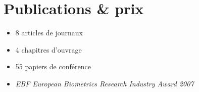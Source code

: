 \documentclass{simplecv}
\begin{document}
\section{Publications \& prix}

\begin{itemize}
  \item 8 articles de journaux
  \item 4 chapitres d'ouvrage
  \item 55 papiers de conf\'{e}rence
  \item \emph{EBF European Biometrics Research Industry Award 2007}
\end{itemize}


% 
% 
\end{document}
